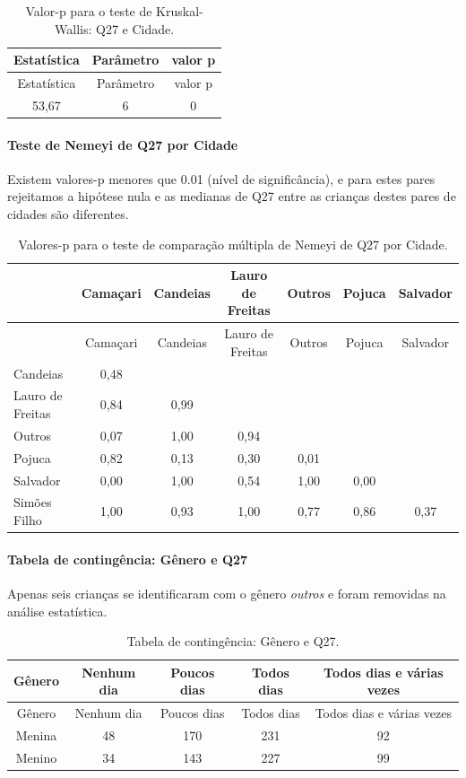 \documentclass[]{article}
\let\oldparagraph\paragraph
\renewcommand{\paragraph}[1]{\oldparagraph{#1}\mbox{}}
\begin{document}
\begin{longtable}[]{@{}ccc@{}}
\caption{\label{tab:unnamed-chunk-787}Valor-p para o teste de Kruskal-Wallis: Q27 e Cidade.}\tabularnewline
\toprule
Estatística & Parâmetro & valor p\tabularnewline
\midrule
\endfirsthead
\toprule
Estatística & Parâmetro & valor p\tabularnewline
\midrule
\endhead
53,67 & 6 & 0\tabularnewline
\bottomrule
\end{longtable}

\hypertarget{teste-de-nemeyi-de-q27-por-cidade}{%
\paragraph{Teste de Nemeyi de Q27 por Cidade}\label{teste-de-nemeyi-de-q27-por-cidade}}

Existem valores-p menores que 0.01 (nível de significância), e para estes pares rejeitamos a hipótese nula e as medianas de Q27 entre as crianças destes pares de cidades são diferentes.

\begin{longtable}[]{@{}lcccccc@{}}
\caption{\label{tab:unnamed-chunk-789}Valores-p para o teste de comparação múltipla de Nemeyi de Q27 por Cidade.}\tabularnewline
\toprule
& Camaçari & Candeias & Lauro de Freitas & Outros & Pojuca & Salvador\tabularnewline
\midrule
\endfirsthead
\toprule
& Camaçari & Candeias & Lauro de Freitas & Outros & Pojuca & Salvador\tabularnewline
\midrule
\endhead
Candeias & 0,48 & & & & &\tabularnewline
Lauro de Freitas & 0,84 & 0,99 & & & &\tabularnewline
Outros & 0,07 & 1,00 & 0,94 & & &\tabularnewline
Pojuca & 0,82 & 0,13 & 0,30 & 0,01 & &\tabularnewline
Salvador & 0,00 & 1,00 & 0,54 & 1,00 & 0,00 &\tabularnewline
Simões Filho & 1,00 & 0,93 & 1,00 & 0,77 & 0,86 & 0,37\tabularnewline
\bottomrule
\end{longtable}

\cleardoublepage

\hypertarget{tabela-de-continguxeancia-guxeanero-e-q27}{%
\paragraph{Tabela de contingência: Gênero e Q27}\label{tabela-de-continguxeancia-guxeanero-e-q27}}

Apenas seis crianças se identificaram com o gênero \emph{outros} e foram removidas na análise estatística.

\begin{longtable}[]{@{}ccccc@{}}
\caption{\label{tab:unnamed-chunk-790}Tabela de contingência: Gênero e Q27.}\tabularnewline
\toprule
Gênero & Nenhum dia & Poucos dias & Todos dias & Todos dias e várias vezes\tabularnewline
\midrule
\endfirsthead
\toprule
Gênero & Nenhum dia & Poucos dias & Todos dias & Todos dias e várias vezes\tabularnewline
\midrule
\endhead
Menina & 48 & 170 & 231 & 92\tabularnewline
Menino & 34 & 143 & 227 & 99\tabularnewline
\bottomrule
\end{longtable}
\end{document}
